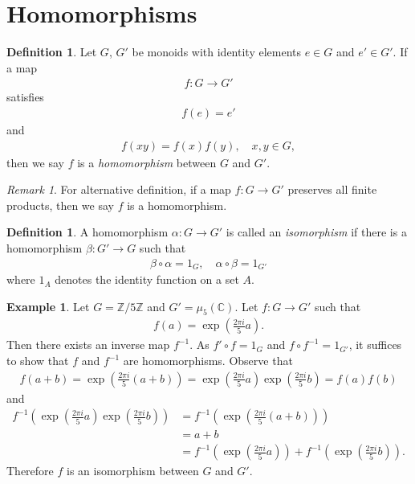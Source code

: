 \documentclass[12pt]{report}
\theoremstyle{plain}
\theoremstyle{remark}
\newtheorem*{remark}{Remark}
\theoremstyle{definition}
\newtheorem{definition}[theorem]{Definition}
\newtheorem{example}[theorem]{Example}
\newcommand{\Z}{\mathbb{Z}}
\newcommand{\C}{\mathbb{C}}
\begin{document}
\section{Homomorphisms}
\begin{definition}
    Let $G$, $G'$ be monoids with identity elements $e\in G$ and $e'\in G'$. If a map
    \begin{align*}
        f:G\rightarrow G'
    \end{align*}
    satisfies
    \begin{align*}
        f(e)=e'
    \end{align*}
    and
    \begin{align*}
        f(xy)=f(x)f(y),\quad x,y\in G,
    \end{align*}
    then we say $f$ is a \emph{homomorphism} between $G$ and $G'$.
\end{definition}
\begin{remark}
    For alternative definition, if a map $f:G\rightarrow G'$ preserves all finite products, then we say $f$ is a homomorphism.
\end{remark}

\begin{definition}
    A homomorphism $\alpha:G\rightarrow G'$ is called an \emph{isomorphism} if there is a homomorphism $\beta:G'\rightarrow G$ such that
    \begin{align*}
        \beta\circ \alpha = 1_G,\quad \alpha\circ\beta = 1_{G'}
    \end{align*}
    where $1_A$ denotes the identity function on a set $A$.
\end{definition}

\begin{example}
    Let $G=\Z/5\Z$ and $G'=\mu_5(\C)$. Let $f:G\rightarrow G'$ such that
    \begin{align*}
        f(a)=\exp \left( \frac{2\pi i}{5}a \right).
    \end{align*}
    Then there exists an inverse map $f^{-1}$. As $f'\circ f=1_G$ and $f\circ f^{-1} = 1_{G'}$, it suffices to show that $f$ and $f^{-1}$ are homomorphisms. Observe that
    \begin{align*}
        f(a+b) = \exp \left(\frac{2\pi i}{5}(a+b)\right) = \exp \left( \frac{2\pi i}{5}a \right) \exp \left( \frac{2\pi i}{5}b \right) = f(a)f(b)
    \end{align*}
    and
    \begin{align*}
        f^{-1} \left( \exp \left( \frac{2\pi i}{5}a \right)\exp \left( \frac{2\pi i}{5}b \right) \right) &= f^{-1} \left( \exp \left( \frac{2\pi i}{5}(a+b) \right) \right) \\
        &= a+b \\
        &= f^{-1}\left( \exp \left( \frac{2\pi i}{5}a \right) \right) + f^{-1} \left( \exp \left( \frac{2\pi i}{5}b \right) \right).
    \end{align*}
    Therefore $f$ is an isomorphism between $G$ and $G'$.
\end{example}
\end{document}
